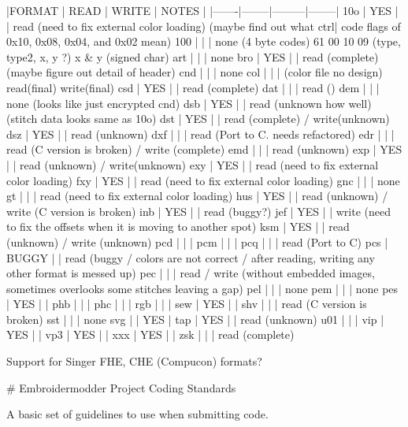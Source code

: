 \documentclass[a4paper, 11pt]{report}
\begin{document}
|FORMAT | READ  | WRITE | NOTES |
|-------|--------|---------|--------|
10o    | YES   |       | read (need to fix external color loading) (maybe find out what ctrl| code flags of 0x10, 0x08, 0x04, and 0x02 mean)
100    |       |       | none (4 byte codes) 61 00 10 09 (type, type2, x, y ?) x & y (signed char)
art    |       |       | none
bro    | YES   |       | read (complete)(maybe figure out detail of header)
cnd    |       |       | none
col    |       |       | (color file no design) read(final) write(final)
csd    | YES   |       | read (complete)
dat    |       |       | read ()
dem    |       |       | none (looks like just encrypted cnd)
dsb    | YES   |       | read (unknown how well) (stitch data looks same as 10o)
dst    | YES   |       | read (complete) / write(unknown)
dsz    | YES   |       | read (unknown)
dxf    |       |       | read (Port to C. needs refactored)
edr    |       |       | read (C version is broken) / write (complete)
emd    |       |       | read (unknown)
exp    | YES   |       | read (unknown) / write(unknown)
exy    | YES   |       | read (need to fix external color loading)
fxy    | YES   |       | read (need to fix external color loading)
gnc    |       |       | none
gt     |       |       | read (need to fix external color loading)
hus    | YES   |       | read (unknown) / write (C version is broken)
inb    | YES   |       | read (buggy?)
jef    | YES   |       | write (need to fix the offsets when it is moving to another spot)
ksm    | YES   |       | read (unknown) / write (unknown)
pcd    |       |       | 
pcm    |       |       | 
pcq    |       |       | read (Port to C)
pcs    | BUGGY |       | read (buggy / colors are not correct / after reading, writing any other format is messed up)
pec    |       |       | read / write (without embedded images, sometimes overlooks some stitches leaving a gap)
pel    |       |       | none
pem    |       |       | none
pes    | YES   |       | 
phb    |       |       | 
phc    |       |       | 
rgb    |       |       | 
sew    | YES   |       | 
shv    |       |       | read (C version is broken)
sst    |       |       | none
svg    |       | YES   | 
tap    | YES   |       | read (unknown)
u01    |       |       | 
vip    | YES   |       | 
vp3    | YES   |       | 
xxx    | YES   |       | 
zsk    |       |       | read (complete)


Support for Singer FHE, CHE (Compucon) formats?

# Embroidermodder Project Coding Standards

A basic set of guidelines to use when submitting code.
\end{document}
